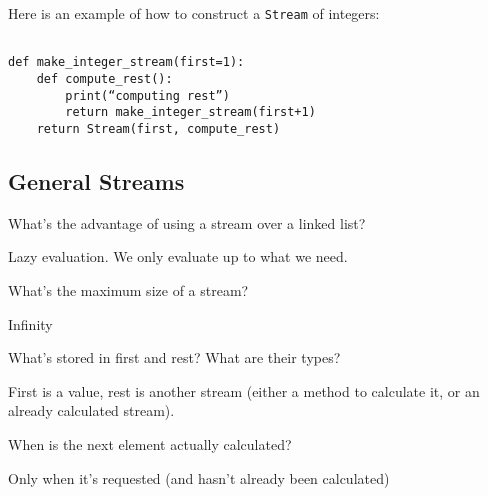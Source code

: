 \documentclass{exam}
\begin{document}
Here is an example of how to construct a \texttt{Stream} of integers:
\begin{lstlisting}

def make_integer_stream(first=1):
    def compute_rest():
        print(“computing rest”)
        return make_integer_stream(first+1)
    return Stream(first, compute_rest)
\end{lstlisting}

\clearpage

\subsection{General Streams}
\begin{questions}
\question What’s the advantage of using a stream over a linked list?
\begin{solution}[0.5in] 
Lazy evaluation. We only evaluate up to what we need.
\end{solution}

\question What’s the maximum size of a stream?
\begin{solution}[0.5in]
Infinity
\end{solution}

\question What’s stored in first and rest? What are their types? 
\begin{solution}[0.5in]
First is a value, rest is another stream (either a method to calculate it, or an already calculated stream).
\end{solution}

\question When is the next element actually calculated?
\begin{solution}[.5in]
Only when it's requested (and hasn't already been calculated)
\end{solution}
\end{questions}
\end{document}
